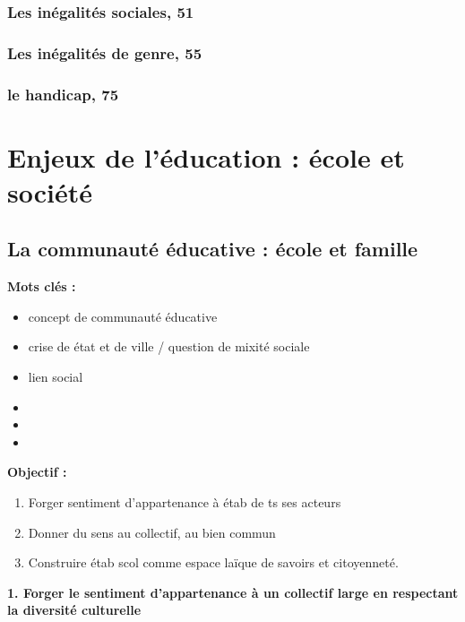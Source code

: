 \documentclass[12pt]{report}
\begin{document}
\begin{itemize}
\section{Les inégalités sociales, 51}
\section{Les inégalités de genre, 55}
\section{le handicap, 75}

\part{Enjeux de l'éducation : école et société}

\chapter{La communauté éducative : école et famille}

\textbf{Mots clés : }
\begin{itemize}
\item concept de communauté éducative
\item crise de état et de ville / question de mixité sociale
\item lien social
\item 
\item 
\item 
\end{itemize}

\vspace{0.5cm}

\textbf{Objectif :}


\begin{enumerate}
\item Forger sentiment d'appartenance à étab de ts ses acteurs\\
\item Donner du sens au collectif, au bien commun\\
\item Construire étab scol comme espace laïque de savoirs et citoyenneté.\\
\end{enumerate}

\textbf{1. Forger le sentiment d'appartenance à un collectif large en respectant la diversité culturelle} \\


\end{itemize}
\end{document}

